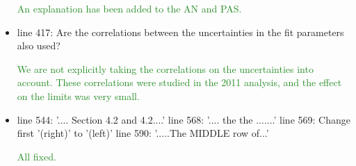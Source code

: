 \documentclass[paper=a4, fontsize=11pt]{scrartcl}
\begin{document}
\begin{itemize}
\textcolor{ForestGreen}{An explanation has been added to the AN and PAS.}\\

\item line 417: Are the correlations between the uncertainties in the fit parameters also used?

\textcolor{ForestGreen}{We are not explicitly taking the correlations on the uncertainties into account. These correlations were studied in the 2011 analysis, and the effect on the limits
was very small.}\\

\item line 544: '.... Section 4.2 and 4.2....' 
line 568: '.... the the .......' 
line 569: Change first '(right)' to '(left)' 
line 590: '.....The MIDDLE row of...'

\textcolor{ForestGreen}{All fixed.}\\

\end{itemize}
\end{document}

